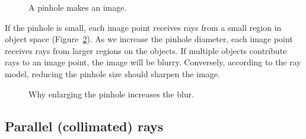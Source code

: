 \documentclass[
  letterpaper,
]{book}
\begin{document}
\begin{figure}


\caption{\label{fig-pinhole-image}A pinhole makes an image.}

\end{figure}%

If the pinhole is small, each image point receives rays from a small
region in object space (Figure~\ref{fig-pinhole-blur}). As we increase
the pinhole diameter, each image point receives rays from larger regions
on the objects. If multiple objects contribute rays to an image point,
the image will be blurry. Conversely, according to the ray model,
reducing the pinhole size should sharpen the image.

\begin{figure}


\caption{\label{fig-pinhole-blur}Why enlarging the pinhole increases the
blur.}

\end{figure}%

\subsection{Parallel (collimated) rays}\label{sec-pinhole-collimated}
\end{document}
